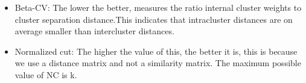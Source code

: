 \begin{itemize}
\begin{figure}[H]
    \end{figure}
    \item Beta-CV: The lower the better, measures the ratio internal cluster weights to cluster separation distance.This indicates that intracluster distances are on average smaller than intercluster distances.
    \item Normalized cut: The higher the value of this, the better it is, this is because we use a distance matrix and not a similarity matrix. The maximum possible value of NC is k.
\end{itemize}